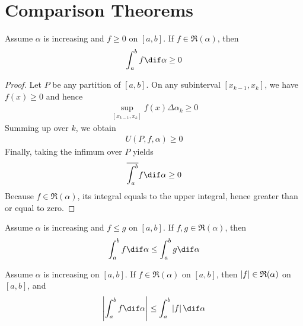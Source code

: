 \documentclass[thmcnt=section, color=blue, 12pt]{my-elegantbook}
\begin{document}
\section{Comparison Theorems}

\begin{theorem}
	Assume $\alpha$ is increasing and $f \geq 0$ on $[a, b]$.
	If $f \in \mathfrak{R}(\alpha)$, then
	\begin{align*}
		\int_a^b f \dif \alpha \geq 0
	\end{align*}
\end{theorem}

\begin{proof}
	Let $P$ be any partition of $[a, b]$.
	On any subinterval $[x_{k-1}, x_k]$,
	we have $f(x) \geq 0$ and hence
	\begin{align*}
		\sup_{[x_{k-1}, x_k]} f(x) \Delta \alpha_k \geq 0
	\end{align*}
	Summing up over $k$, we obtain
	\begin{align*}
		U(P, f, \alpha) \geq 0
	\end{align*}
	Finally, taking the infimum over $P$ yields
	\begin{align*}
		\overline{\int_a^b} f \dif \alpha \geq 0
	\end{align*}
	Because $f \in \mathfrak{R}(\alpha)$,
	its integral equals to the upper integral,
	hence greater than or equal to zero.
\end{proof}

\begin{corollary} \label{cor:2}
	Assume $\alpha$ is increasing and $f \leq g$ on $[a, b]$.
	If $f, g \in \mathfrak{R}(\alpha)$, then
	\begin{align*}
		\int_a^b f \dif \alpha \leq \int_a^b g \dif \alpha
	\end{align*}
\end{corollary}

\begin{theorem} \label{thm:28}
	Assume $\alpha$ is increasing on $[a, b]$.
	If $f \in \mathfrak{R}(\alpha)$ on $[a, b]$,
	then $\left\lvert f \right\rvert \in \mathfrak{R}(\alpha)$ on $[a, b]$, and
	\begin{align}
		\abs{\int_a^b f \dif \alpha} \leq \int_a^b \abs{f} \dif \alpha
		\label{eq:47}
	\end{align}
\end{theorem}
\end{document}
